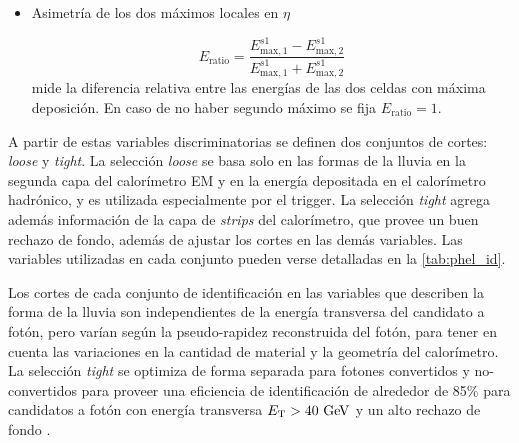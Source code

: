 \begin{itemize}
\item Asimetría de los dos máximos locales en $\eta$

  \begin{equation}
    E_\mathrm{ratio} = \frac{ E^{s1}_{\mathrm{max},1} - E^{s1}_{\mathrm{max},2} }{ E^{s1}_{\mathrm{max},1} + E^{s1}_{\mathrm{max},2} }
  \end{equation}
  mide la diferencia relativa entre las energías de las dos celdas con máxima
  deposición. En caso de no haber segundo máximo se fija $E_\mathrm{ratio} = 1$.

\end{itemize}


A partir de estas variables discriminatorias se definen dos conjuntos de cortes:
\emph{loose} y \emph{tight}.
La selección \emph{loose} se basa solo en las formas de la lluvia
en la segunda capa del calorímetro EM y en la energía depositada en el
calorímetro hadrónico, y es utilizada especialmente por el trigger. La selección
\emph{tight} agrega además información de la capa de \emph{strips} del calorímetro, que
provee un buen rechazo de fondo, además de ajustar los cortes en las
demás variables. Las variables utilizadas en cada conjunto pueden verse detalladas
en la \cref{tab:phel_id}.

Los cortes de cada conjunto de identificación en las variables que
describen la forma de la lluvia son independientes de la energía transversa del
candidato a fotón, pero varían según la pseudo-rapidez reconstruida del fotón,
para tener en cuenta las variaciones en la cantidad de material y la geometría
del calorímetro.
La selección \emph{tight} se optimiza de forma separada para
fotones convertidos y no-convertidos para proveer una eficiencia de
identificación de alrededor de 85\% para candidatos a fotón con energía
transversa $\et>40 \gev$ y un alto rechazo de fondo \cite{Delmastro:1747242}.



